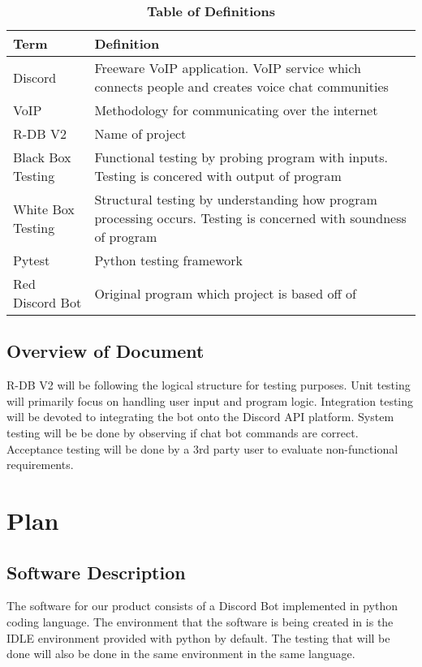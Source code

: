 \documentclass[12pt, titlepage]{article}
\begin{document}
\begin{table}[!htbp]
\caption{\textbf{Table of Definitions}} \label{Table}

\begin{tabularx}{\textwidth}{p{3cm}X}
\toprule
\textbf{Term} & \textbf{Definition}\\
\midrule
Discord & Freeware VoIP application. VoIP service which connects people and creates voice chat communities\\
VoIP & Methodology for communicating over the internet\\
R-DB V2 & Name of project\\
Black Box Testing & Functional testing by probing program with inputs. Testing is concered with output of program\\
White Box Testing & Structural testing by understanding how program processing occurs. Testing is concerned with soundness of program\\
Pytest & Python testing framework\\
Red Discord Bot & Original program which project is based off of\\
\bottomrule
\end{tabularx}

\end{table}	

\subsection{Overview of Document}
R-DB V2 will be following the logical structure for testing purposes. Unit testing will primarily focus on handling user input and program logic. Integration testing will be devoted to integrating the bot onto the Discord API platform. System testing will be be done by observing if chat bot commands are correct. Acceptance testing will be done by a 3rd party user to evaluate non-functional requirements.  

\section{Plan}
	
\subsection{Software Description}

The software for our product consists of a Discord Bot implemented in python coding language. The environment that the software is being created in is the IDLE environment provided with python by default. The testing that will be done will also be done in the same environment in the same language. 
\end{document}
